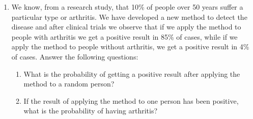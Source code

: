 \begin{enumerate}[leftmargin=*,resume]
\item 
We know, from a research study, that 10\% of people over 50 years suffer a particular type or arthritis.
We have developed a new method to detect the disease and after clinical trials we observe that if we apply the method to
people with arthritis we get a positive result in 85\% of cases, while if we apply the method to people without
arthritis, we get a positive result in 4\% of cases.
Answer the following questions:
\begin{enumerate}
\item What is the probability of getting a positive result after applying the method to a random person?
\item If the result of applying the method to one person has been positive, what is the probability of having arthritis?
\end{enumerate}

% 
% 


\end{enumerate}

